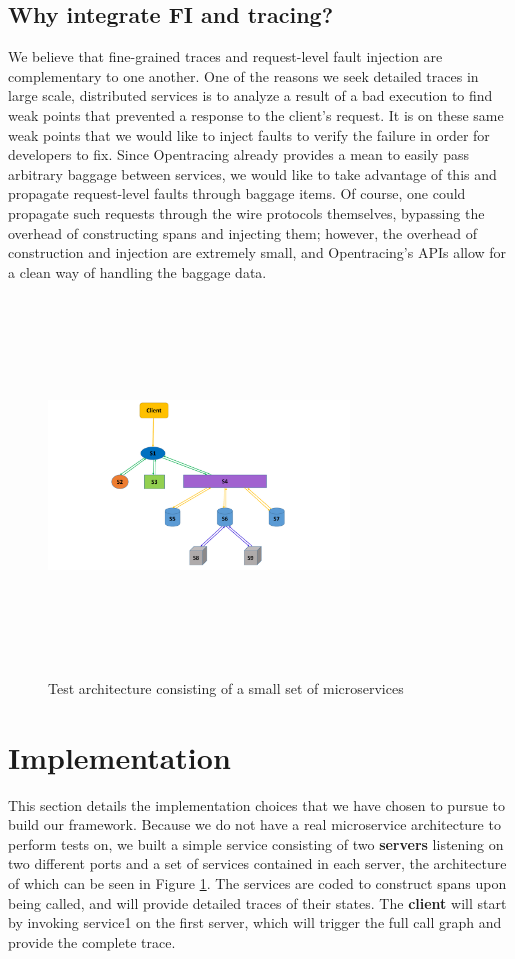 \documentclass[letterpaper,twocolumn,10pt]{article}
\begin{document}
\subsection{Why integrate FI and tracing?}
We believe that fine-grained traces and request-level fault injection are complementary to one another.
One of the reasons we seek detailed traces in large scale, distributed services is to analyze a result
of a bad execution to find weak points that prevented a response to the client's request. It is on these
same weak points that we would like to inject faults to verify the failure in order for developers to fix.
Since Opentracing already provides a mean to easily pass arbitrary baggage between services, we would like
to take advantage of this and propagate request-level faults through baggage items. Of course, one could propagate such requests through the wire protocols themselves, bypassing the overhead of constructing spans and injecting them; however, the overhead of construction and injection are extremely small, and Opentracing's APIs allow for a clean way of handling the baggage data. 


\begin{figure}
\centering
\includegraphics[width=8cm,height=10cm,keepaspectratio=true]{toy_architecture}
\caption{Test architecture consisting of a small set of microservices}
\label{toy_arch}
\end{figure}


\section{Implementation} \label{implementation}
This section details the implementation choices that we have chosen to pursue to build our framework. Because we do not have a real microservice architecture to perform tests on, we built a simple service consisting of two \textbf{servers} listening on two different ports and a set of services contained in each server, the architecture of which can be seen in Figure \ref{toy_arch}. The services are coded to construct spans upon being called, and will provide detailed traces of their states. The \textbf{client} will start by invoking service1 on the first server, which will trigger the full call graph and provide the complete trace.
\end{document}
